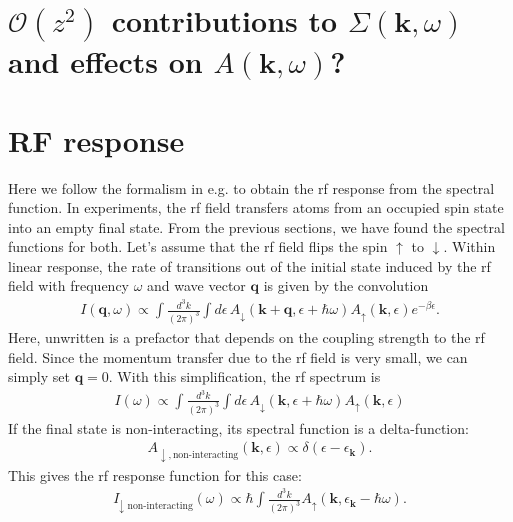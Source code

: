 \documentclass{article}
\theoremstyle{definition}
\newcommand{\be}{\beta}
\newcommand{\f}[2]{\frac{#1}{#2}}
\begin{document}
\section{$\mathcal{O}(z^2)$ contributions to $\Sigma(\mathbf{k},\omega)$ and effects on $A(\mathbf{k}, \omega)$?}




\section{RF response}

Here we follow the formalism in e.g. \cite{haussmann2009spectral} to obtain the rf response from the spectral function. In experiments, the rf field transfers atoms from an occupied spin state into an empty final state. From the previous sections, we have found the spectral functions for both. Let's assume that the rf field flips the spin $\uparrow$ to $\downarrow$. Within linear response, the rate of transitions out of the initial state induced by the rf field with frequency $\omega$ and wave vector $\mathbf{q}$ is given by the convolution 
\begin{align}
I(\mathbf{q}, \omega)
\propto 
\int \f{d^3 k}{(2\pi)^3} \int d\epsilon \, A_\downarrow(\mathbf{k} + \mathbf{q}, \epsilon + \hbar \omega) A_\uparrow(\mathbf{k}, \epsilon) e^{-\be \epsilon}.
\end{align}
Here, unwritten is a prefactor that depends on the coupling strength to the rf field. Since the momentum transfer due to the rf field is very small, we can simply set $\mathbf{q} = 0$. With this simplification, the rf spectrum is 
\begin{align}
I(\omega) 
\propto
\int \f{d^3k}{(2\pi)^3} 
\int d\epsilon \, A_\downarrow(\mathbf{k}, \epsilon + \hbar \omega) A_\uparrow(\mathbf{k}, \epsilon)
\end{align}
If the final state is non-interacting, its spectral function is a delta-function:
\begin{align}
A_{\downarrow, \text{non-interacting}} (\mathbf{k},\epsilon) 
\propto
\delta(\epsilon - \epsilon_\mathbf{k}).
\end{align}
This gives the rf response function for this case:
\begin{align}
I_{\downarrow \text{ non-interacting}}(\omega) \propto 
\hbar \int \f{d^3k}{(2\pi)^3}  A_\uparrow(\mathbf{k}, \epsilon_\mathbf{k} - \hbar \omega).
\end{align}


 
	
\end{document}
